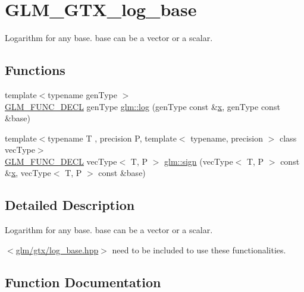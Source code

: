 \hypertarget{group__gtx__log__base}{}\section{G\+L\+M\+\_\+\+G\+T\+X\+\_\+log\+\_\+base}
\label{group__gtx__log__base}


Logarithm for any base. base can be a vector or a scalar.  


\subsection*{Functions}
\begin{DoxyCompactItemize}
\item 
{\footnotesize template$<$typename gen\+Type $>$ }\\\mbox{\hyperlink{setup_8hpp_ab2d052de21a70539923e9bcbf6e83a51}{G\+L\+M\+\_\+\+F\+U\+N\+C\+\_\+\+D\+E\+CL}} gen\+Type \mbox{\hyperlink{group__gtx__log__base_ga60a7b0a401da660869946b2b77c710c9}{glm\+::log}} (gen\+Type const \&\mbox{\hyperlink{glad_8h_a92d0386e5c19fb81ea88c9f99644ab1d}{x}}, gen\+Type const \&base)
\item 
{\footnotesize template$<$typename T , precision P, template$<$ typename, precision $>$ class vec\+Type$>$ }\\\mbox{\hyperlink{setup_8hpp_ab2d052de21a70539923e9bcbf6e83a51}{G\+L\+M\+\_\+\+F\+U\+N\+C\+\_\+\+D\+E\+CL}} vec\+Type$<$ T, P $>$ \mbox{\hyperlink{group__gtx__log__base_ga1842004a127a9f3573764362ff639191}{glm\+::sign}} (vec\+Type$<$ T, P $>$ const \&\mbox{\hyperlink{glad_8h_a92d0386e5c19fb81ea88c9f99644ab1d}{x}}, vec\+Type$<$ T, P $>$ const \&base)
\end{DoxyCompactItemize}


\subsection{Detailed Description}
Logarithm for any base. base can be a vector or a scalar. 

$<$\mbox{\hyperlink{log__base_8hpp}{glm/gtx/log\+\_\+base.\+hpp}}$>$ need to be included to use these functionalities. 

\subsection{Function Documentation}
\mbox{\label{group__gtx__log__base_ga60a7b0a401da660869946b2b77c710c9}} 
